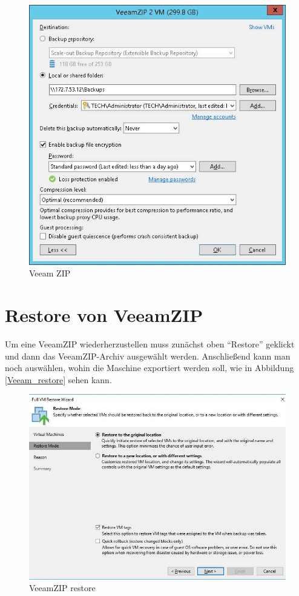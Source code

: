 \begin{figure}[!htb]
\centering
\includegraphics{./images/veeam_zip.jpg}
\caption{Veeam ZIP}\label{Veeam-zip}
\end{figure}

\hypertarget{restore-von-veeamzip}{%
\section{Restore von VeeamZIP}\label{restore-von-veeamzip}}

Um eine VeeamZIP wiederherzustellen muss zunächst oben ``Restore''
geklickt und dann das VeeamZIP-Archiv ausgewählt werden. Anschließend
kann man noch auswählen, wohin die Maschine exportiert werden soll, wie
in Abbildung \ref{Veeam_restore} sehen kann.

\begin{figure}[!htb]
\centering
\includegraphics{./images/veeam_restore.jpg}
\caption{VeeamZIP restore}\label{Veeam-restore}
\end{figure}

